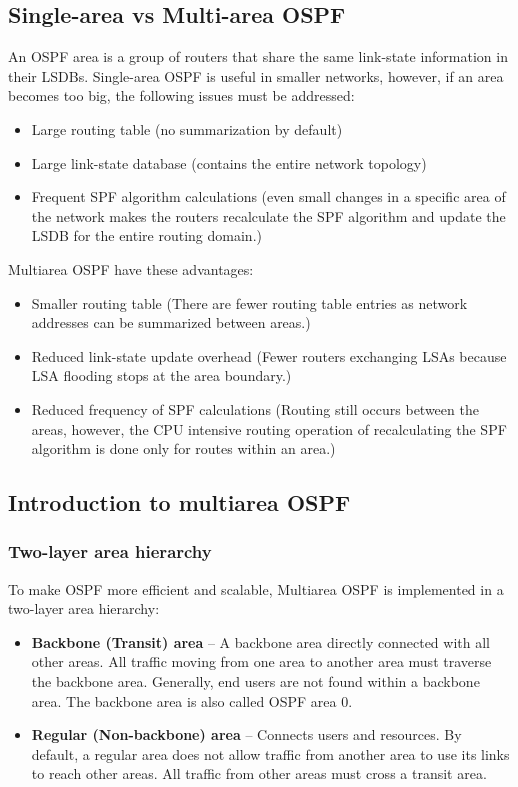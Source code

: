 \subsection{Single-area vs Multi-area OSPF}
An OSPF area is a group of routers that share the same link-state information in their LSDBs.
Single-area OSPF is useful in smaller networks, however, if an area becomes too big, the following issues must be addressed:
\begin{itemize}
	\item Large routing table (no summarization by default)
	\item Large link-state database (contains the entire network topology)
	\item Frequent SPF algorithm calculations (even small changes in a specific area of the network makes the routers recalculate the SPF algorithm and update the LSDB for the entire routing domain.)
	\end{itemize}
Multiarea OSPF have these advantages:
\begin{itemize}
	\item Smaller routing table (There are fewer routing table entries as network addresses can be summarized between areas.)
	\item Reduced link-state update overhead (Fewer routers exchanging LSAs because LSA flooding stops at the area boundary.)
	\item Reduced frequency of SPF calculations (Routing still occurs between the areas, however, the CPU intensive routing operation of recalculating the SPF algorithm is done only for routes within an area.)
	\end{itemize}
	
\subsection{Introduction to multiarea OSPF}
\subsubsection{Two-layer area hierarchy}
To make OSPF more efficient and scalable, Multiarea OSPF is implemented in a two-layer area hierarchy:
\begin{itemize}
	\item \textbf{Backbone (Transit) area} -- A backbone area directly connected with all other areas. All traffic moving from one area to another area must traverse the backbone area. Generally, end users are not found within a backbone area. The backbone area is also called OSPF area 0.
	\item \textbf{Regular (Non-backbone) area} -- Connects users and resources. By default, a regular area does not allow traffic from another area to use its links to reach other areas. All traffic from other areas must cross a transit area.
	\end{itemize}
	
